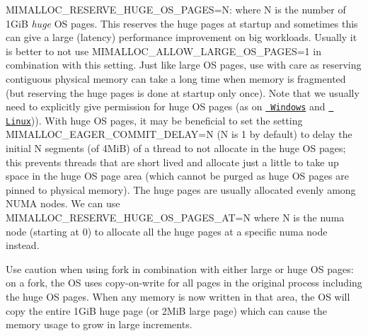 \begin{DoxyItemize}
\item {\ttfamily MIMALLOC\+\_\+\+RESERVE\+\_\+\+HUGE\+\_\+\+OS\+\_\+\+PAGES=N}\+: where {\ttfamily N} is the number of 1GiB {\itshape huge} OS pages. This reserves the huge pages at startup and sometimes this can give a large (latency) performance improvement on big workloads. Usually it is better to not use {\ttfamily MIMALLOC\+\_\+\+ALLOW\+\_\+\+LARGE\+\_\+\+OS\+\_\+\+PAGES=1} in combination with this setting. Just like large OS pages, use with care as reserving contiguous physical memory can take a long time when memory is fragmented (but reserving the huge pages is done at startup only once). Note that we usually need to explicitly give permission for huge OS pages (as on \href{https://docs.microsoft.com/en-us/sql/database-engine/configure-windows/enable-the-lock-pages-in-memory-option-windows?view=sql-server-2017}{\texttt{ Windows}} and \href{https://access.redhat.com/documentation/en-us/red_hat_enterprise_linux/5/html/tuning_and_optimizing_red_hat_enterprise_linux_for_oracle_9i_and_10g_databases/sect-oracle_9i_and_10g_tuning_guide-large_memory_optimization_big_pages_and_huge_pages-configuring_huge_pages_in_red_hat_enterprise_linux_4_or_5}{\texttt{ Linux}})). With huge OS pages, it may be beneficial to set the setting {\ttfamily MIMALLOC\+\_\+\+EAGER\+\_\+\+COMMIT\+\_\+\+DELAY=N} ({\ttfamily N} is 1 by default) to delay the initial {\ttfamily N} segments (of 4MiB) of a thread to not allocate in the huge OS pages; this prevents threads that are short lived and allocate just a little to take up space in the huge OS page area (which cannot be purged as huge OS pages are pinned to physical memory). The huge pages are usually allocated evenly among NUMA nodes. We can use {\ttfamily MIMALLOC\+\_\+\+RESERVE\+\_\+\+HUGE\+\_\+\+OS\+\_\+\+PAGES\+\_\+\+AT=N} where {\ttfamily N} is the numa node (starting at 0) to allocate all the huge pages at a specific numa node instead.
\end{DoxyItemize}

Use caution when using {\ttfamily fork} in combination with either large or huge OS pages\+: on a fork, the OS uses copy-\/on-\/write for all pages in the original process including the huge OS pages. When any memory is now written in that area, the OS will copy the entire 1GiB huge page (or 2MiB large page) which can cause the memory usage to grow in large increments. 